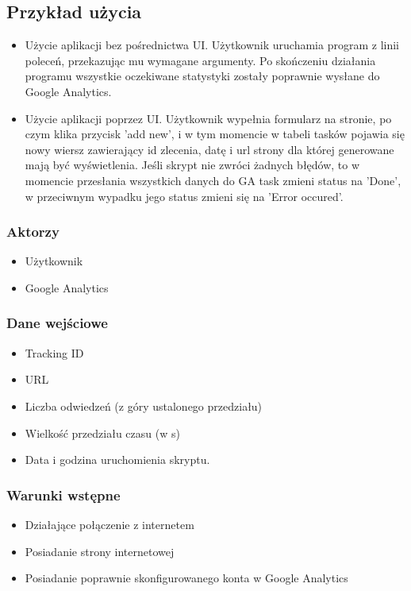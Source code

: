 \documentclass{article}
\begin{document}
\subsection{Przykład użycia}
\begin{itemize}
\item Użycie aplikacji bez pośrednictwa UI. Użytkownik uruchamia program z linii poleceń, przekazując mu wymagane argumenty. Po skończeniu działania programu wszystkie oczekiwane statystyki zostały poprawnie wysłane do Google Analytics.
\item Użycie aplikacji poprzez UI. Użytkownik wypełnia formularz na stronie, po czym klika przycisk 'add new', i w tym momencie w tabeli tasków pojawia się nowy wiersz zawierający
    id zlecenia, datę i url strony dla której generowane mają być wyświetlenia. Jeśli skrypt nie zwróci żadnych błędów, to w momencie przesłania wszystkich danych do GA task zmieni status na 'Done', w przeciwnym wypadku jego status zmieni się na 'Error occured'.
\end{itemize}

\subsubsection{Aktorzy}
\begin{itemize}
\item Użytkownik
\item Google Analytics
\end{itemize}

\subsubsection{Dane wejściowe}
\begin{itemize}
\item Tracking ID
\item URL
\item Liczba odwiedzeń (z góry ustalonego przedziału)
\item Wielkość przedziału czasu (w s)
\item Data i godzina uruchomienia skryptu.
\end{itemize}

\subsubsection{Warunki wstępne}
\begin{itemize}
\item Działające połączenie z internetem
\item Posiadanie strony internetowej
\item Posiadanie poprawnie skonfigurowanego konta w Google Analytics
\end{itemize}
\end{document}

